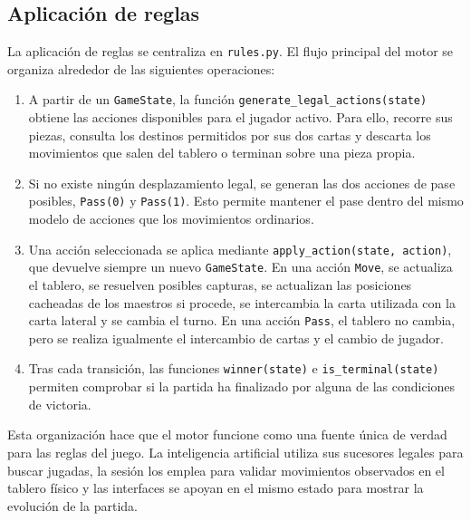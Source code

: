 \subsection{Aplicación de reglas}
\label{subsec:aplicacion-reglas}

La aplicación de reglas se centraliza en \texttt{rules.py}. El flujo principal del motor se organiza alrededor de las siguientes operaciones:

\begin{enumerate}
    \item A partir de un \texttt{GameState}, la función \texttt{generate\_legal\_actions(state)} obtiene las acciones disponibles para el jugador activo. Para ello, recorre sus piezas, consulta los destinos permitidos por sus dos cartas y descarta los movimientos que salen del tablero o terminan sobre una pieza propia.

    \item Si no existe ningún desplazamiento legal, se generan las dos acciones de pase posibles, \texttt{Pass(0)} y \texttt{Pass(1)}. Esto permite mantener el pase dentro del mismo modelo de acciones que los movimientos ordinarios.

    \item Una acción seleccionada se aplica mediante \texttt{apply\_action(state, action)}, que devuelve siempre un nuevo \texttt{GameState}. En una acción \texttt{Move}, se actualiza el tablero, se resuelven posibles capturas, se actualizan las posiciones cacheadas de los maestros si procede, se intercambia la carta utilizada con la carta lateral y se cambia el turno. En una acción \texttt{Pass}, el tablero no cambia, pero se realiza igualmente el intercambio de cartas y el cambio de jugador.

    \item Tras cada transición, las funciones \texttt{winner(state)} e \texttt{is\_terminal(state)} permiten comprobar si la partida ha finalizado por alguna de las condiciones de victoria.
\end{enumerate}

Esta organización hace que el motor funcione como una fuente única de verdad para las reglas del juego. La inteligencia artificial utiliza sus sucesores legales para buscar jugadas, la sesión los emplea para validar movimientos observados en el tablero físico y las interfaces se apoyan en el mismo estado para mostrar la evolución de la partida.


